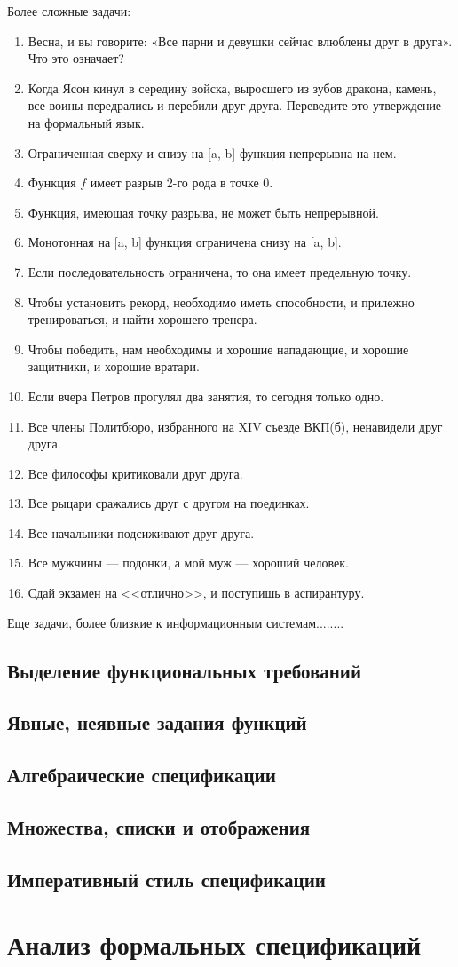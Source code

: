 \documentclass[14pt]{extreport}
\makeatletter
\renewcommand\appendix{\par
  \setcounter{chapter}{0}%
  \setcounter{section}{0}%
  \def\@chapapp{\appendixname}%
  \def\thechapter{\@Asbuk\c@chapter}}
\makeatother
\begin{document}
Более сложные задачи:
\begin{enumerate}
\item Весна, и вы говорите: «Все парни и девушки сейчас влюблены друг в друга». Что это означает?
\item Когда Ясон кинул в середину войска, выросшего из зубов дракона, камень, все воины передрались и перебили друг друга.
Переведите это утверждение на формальный язык.
\item Ограниченная сверху и снизу на [a, b] функция непрерывна на нем.
\item Функция $f$ имеет разрыв 2-го рода в точке 0.
\item Функция, имеющая точку разрыва, не может быть непрерывной.
\item Монотонная на [a, b] функция ограничена снизу на [a, b].
\item Если последовательность ограничена, то она имеет предельную точку.
\item Чтобы установить рекорд, необходимо иметь способности, и прилежно тренироваться, и найти хорошего тренера.
\item Чтобы победить, нам необходимы и хорошие нападающие, и хорошие защитники, и хорошие вратари.
\item Если вчера Петров прогулял два занятия, то сегодня только одно.
\item Все члены Политбюро, избранного на XIV съезде ВКП(б), ненавидели друг друга.
\item Все философы критиковали друг друга.
\item Все рыцари сражались друг с другом на поединках.
\item Все начальники подсиживают друг друга.
\item Все мужчины --- подонки, а мой муж --- хороший человек.
\item Сдай экзамен на <<отлично>>, и поступишь в аспирантуру.
\end{enumerate}

Еще задачи, более близкие к информационным системам........

\section{Выделение функциональных требований}

\section{Явные, неявные задания функций}

\section{Алгебраические спецификации}

\section{Множества, списки и отображения}

\section{Императивный стиль спецификации}

\chapter{Анализ формальных спецификаций}

\appendix

\end{document}
